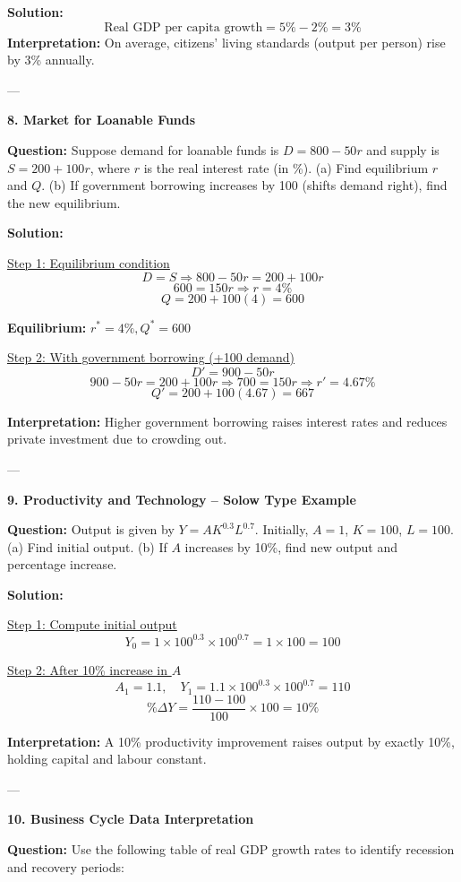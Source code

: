 \documentclass[12pt]{article}
\begin{document}
\textbf{Solution:}
\[
\text{Real GDP per capita growth} = 5\% - 2\% = 3\%
\]
\textbf{Interpretation:}  
On average, citizens’ living standards (output per person) rise by 3\% annually.

---

\textbf{8. Market for Loanable Funds}

\textbf{Question:}  
Suppose demand for loanable funds is \( D = 800 - 50r \) and supply is \( S = 200 + 100r \), where \(r\) is the real interest rate (in \%).  
(a) Find equilibrium \(r\) and \(Q\).  
(b) If government borrowing increases by 100 (shifts demand right), find the new equilibrium.

\textbf{Solution:}

\underline{Step 1: Equilibrium condition}
\[
D = S \Rightarrow 800 - 50r = 200 + 100r
\]
\[
600 = 150r \Rightarrow r = 4\%
\]
\[
Q = 200 + 100(4) = 600
\]

\textbf{Equilibrium:} \(r^* = 4\%, Q^* = 600\)

\underline{Step 2: With government borrowing (+100 demand)}
\[
D' = 900 - 50r
\]
\[
900 - 50r = 200 + 100r \Rightarrow 700 = 150r \Rightarrow r' = 4.67\%
\]
\[
Q' = 200 + 100(4.67) = 667
\]

\textbf{Interpretation:}  
Higher government borrowing raises interest rates and reduces private investment due to crowding out.

---

\textbf{9. Productivity and Technology – Solow Type Example}

\textbf{Question:}  
Output is given by \(Y = A K^{0.3} L^{0.7}\). Initially, \(A=1\), \(K=100\), \(L=100\).  
(a) Find initial output.  
(b) If \(A\) increases by 10\%, find new output and percentage increase.

\textbf{Solution:}

\underline{Step 1: Compute initial output}
\[
Y_0 = 1 \times 100^{0.3} \times 100^{0.7} = 1 \times 100 = 100
\]

\underline{Step 2: After 10\% increase in \(A\)}
\[
A_1 = 1.1, \quad Y_1 = 1.1 \times 100^{0.3} \times 100^{0.7} = 110
\]
\[
\%\Delta Y = \frac{110 - 100}{100} \times 100 = 10\%
\]

\textbf{Interpretation:}  
A 10\% productivity improvement raises output by exactly 10\%, holding capital and labour constant.

---

\textbf{10. Business Cycle Data Interpretation}

\textbf{Question:}  
Use the following table of real GDP growth rates to identify recession and recovery periods:
\end{document}

